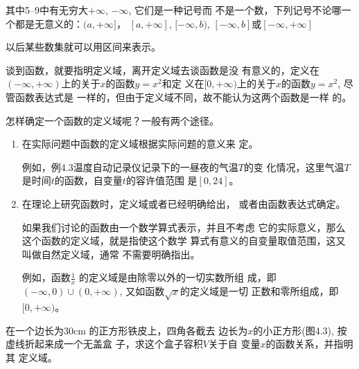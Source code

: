其中5--9中有无穷大$+\infty$, $-\infty$, 它们是一种记号而
不是一个数，下列记号不论哪一个都是无意义的：$(a,+\infty]$，
$[a,+\infty]$, $[-\infty,b)$, $[-\infty,b]$或$[-\infty,+\infty]$

以后某些数集就可以用区间来表示。

谈到函数，就要指明定义域，离开定义域去谈函数是没
有意义的，定义在$(-\infty,+\infty)$上的关于$x$的函数$y=x^2$和定
义在$[0,+\infty)$上的关于$x$的函数$y=x^2$, 尽管函数表达式是
一样的，但由于定义域不同，故不能认为这两个函数是一样
的。

怎样确定一个函数的定义域呢？一般有两个途径。
\begin{enumerate}
    \item 在实际问题中函数的定义域根据实际问题的意义来
    定。

    例如，例4.3温度自动记录仪记录下的一昼夜的气温$T$的变
    化情况，这里气温$T$是时间$t$的函数，自变量$t$的容许值范围
    是$[0,24]$。

    \item 在理论上研究函数时，定义域或者已经明确给出，
    或者由函数表达式确定。

    如果我们讨论的函数由一个数学算式表示，并且不考虑
    它的实际意义，那么这个函数的定义域，就是指使这个数学
    算式有意义的自变量取值范围，这又叫做自然定义域，通常
    不需要明确指出。

    例如，函数$\frac{1}{x}$
    的定义域是由除零以外的一切实数所组
    成，即$(-\infty,0)\cup(0,+\infty)$, 又如函数$\sqrt{x}$的定义域是一切
    正数和零所组成，即$[0,+\infty)$。
\end{enumerate}


\begin{example}
 在一个边长为30cm
的正方形铁皮上，四角各截去
边长为$x$的小正方形(图4.3),
按虚线折起来成一个无盖盒
子，求这个盒子容积$V$关于自
变量$x$的函数关系，并指明其
定义域。   
\end{example}

\begin{figure}[htp]
    \centering
{}
    \caption{}
\end{figure}

